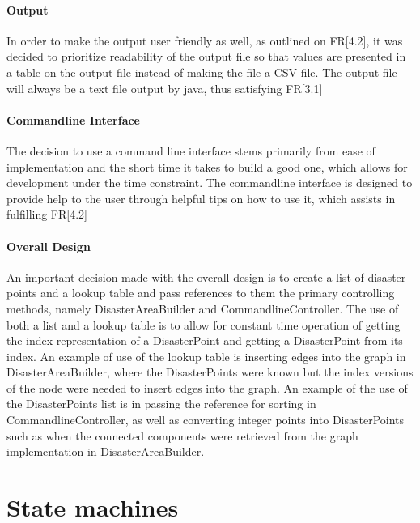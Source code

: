 \documentclass[12pt]{article}
\begin{document}
    \paragraph{Output} In order to make the output user friendly as well, as outlined on FR[4.2], it was decided to prioritize readability of the output file so that values are presented in a table on the output file instead of making the file a CSV file. The output file will always be a text file output by java, thus satisfying FR[3.1]
    
    \paragraph{Commandline Interface} The decision to use a command line interface stems primarily from ease of implementation and the short time it takes to build a good one, which allows for development under the time constraint. The commandline interface is designed to provide help to the user through helpful tips on how to use it, which assists in fulfilling FR[4.2]
    
    \paragraph{Overall Design} An important decision made with the overall design is to create a list of disaster points and a lookup table and pass references to them the primary controlling methods, namely DisasterAreaBuilder and CommandlineController. The use of both a list and a lookup table is to allow for constant time operation of getting the index representation of a DisasterPoint and getting a DisasterPoint from its index. An example of use of the lookup table is inserting edges into the graph in DisasterAreaBuilder, where the DisasterPoints were known but the index versions of the node were needed to insert edges into the graph. An example of the use of the DisasterPoints list is in passing the reference for sorting in CommandlineController, as well as converting integer points into DisasterPoints such as when the connected components were retrieved from the graph implementation in DisasterAreaBuilder.

\section*{State machines}
\end{document}
